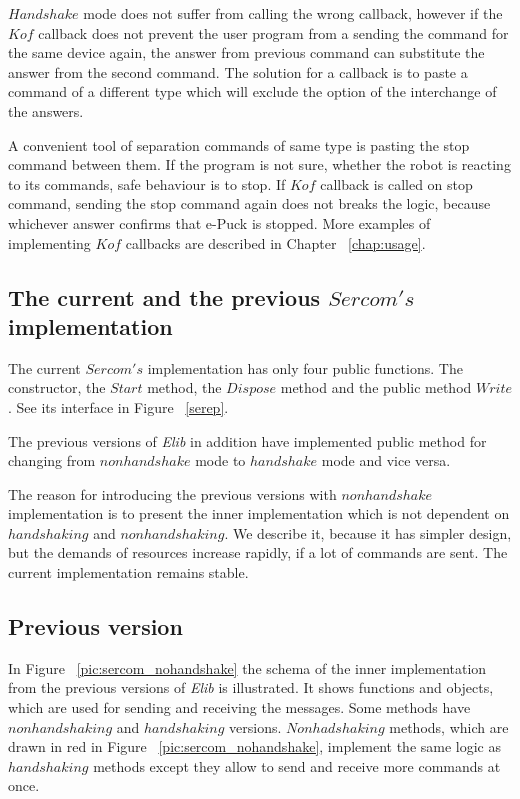   $Handshake$ mode does not suffer from calling the wrong callback, however if the $Kof$ callback
  does not prevent the user program from a sending the command for the same device again,
  the answer from previous command can substitute the answer from the second command.
  The solution for a callback is to paste a command of a different type which will exclude the option
  of the interchange of the answers.

  A convenient tool of separation commands of same type is pasting the stop command between them.
  If the program is not sure, whether the robot is reacting to its commands, safe behaviour is to stop.
  If $Kof$ callback is called on stop command, sending the stop command again does not breaks the logic,
  because whichever answer confirms that e-Puck is stopped. More examples of implementing $Kof$ callbacks
  are described in Chapter ~\ref{chap:usage}.
\subsection{The current and the previous $Sercom's$ implementation}\label{sec:versions}
  The current $Sercom's$ implementation has only four public functions.
  The constructor, the $Start$ method, the $Dispose$ method and the public method $Write$. 
  See its interface in Figure ~\ref{serep}.	

  The previous versions of {\it Elib} in addition have implemented public method for changing from $nonhandshake$ mode to 
  $handshake$ mode and vice versa.

  The reason for introducing the previous versions with $nonhandshake$ implementation is to present 
  the inner implementation which is not dependent on $handshaking$ and $nonhandshaking$.
  We describe it, because it has simpler design, but the demands of resources increase rapidly, if a lot of commands are sent.
  The current implementation remains stable.
\subsection*{Previous version}\label{previous}
  In  Figure ~\ref{pic:sercom_nohandshake} the schema of the inner implementation 
  from the previous versions of {\it Elib} is illustrated.
  It shows functions and objects, which are used for sending and receiving the messages.
  Some methods have $nonhandshaking$ and $handshaking$ versions.
  $Nonhadshaking$ methods, which are drawn in red	in Figure ~\ref{pic:sercom_nohandshake}, implement the same logic 
  as $handshaking$ methods except they allow to send and receive more commands
  at once.

